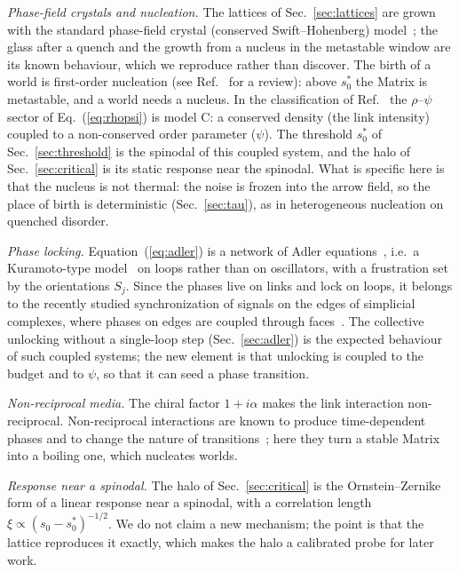 \documentclass[reprint,pre,amsmath,amssymb,superscriptaddress,nofootinbib]{revtex4-2}
\newcommand{\sz}{s_0}
\newcommand{\szc}{s_0^{*}}
\begin{document}
\emph{Phase-field crystals and nucleation.} The lattices of Sec.~\ref{sec:lattices} are grown with the standard phase-field crystal (conserved Swift--Hohenberg) model~\cite{Swift1977,Elder2002,Elder2004}; the glass after a quench and the growth from a nucleus in the metastable window are its known behaviour, which we reproduce rather than discover. The birth of a world is first-order nucleation (see Ref.~\cite{Oxtoby1992} for a review): above $\szc$ the Matrix is metastable, and a world needs a nucleus. In the classification of Ref.~\cite{Hohenberg1977} the $\rho$--$\psi$ sector of Eq.~(\ref{eq:rhopsi}) is model C: a conserved density (the link intensity) coupled to a non-conserved order parameter ($\psi$). The threshold $\szc$ of Sec.~\ref{sec:threshold} is the spinodal of this coupled system, and the halo of Sec.~\ref{sec:critical} is its static response near the spinodal. What is specific here is that the nucleus is not thermal: the noise is frozen into the arrow field, so the place of birth is deterministic (Sec.~\ref{sec:tau}), as in heterogeneous nucleation on quenched disorder.

\emph{Phase locking.} Equation~(\ref{eq:adler}) is a network of Adler equations~\cite{Adler1946}, i.e.\ a Kuramoto-type model~\cite{Kuramoto1984,Acebron2005} on loops rather than on oscillators, with a frustration set by the orientations $S_j$. Since the phases live on links and lock on loops, it belongs to the recently studied synchronization of signals on the edges of simplicial complexes, where phases on edges are coupled through faces~\cite{Millan2020}. The collective unlocking without a single-loop step (Sec.~\ref{sec:adler}) is the expected behaviour of such coupled systems; the new element is that unlocking is coupled to the budget and to $\psi$, so that it can seed a phase transition.

\emph{Non-reciprocal media.} The chiral factor $1+i\alpha$ makes the link interaction non-reciprocal. Non-reciprocal interactions are known to produce time-dependent phases and to change the nature of transitions~\cite{Fruchart2021}; here they turn a stable Matrix into a boiling one, which nucleates worlds.

\emph{Response near a spinodal.} The halo of Sec.~\ref{sec:critical} is the Ornstein--Zernike form of a linear response near a spinodal, with a correlation length $\xi\propto(\sz-\szc)^{-1/2}$. We do not claim a new mechanism; the point is that the lattice reproduces it exactly, which makes the halo a calibrated probe for later work.
\end{document}
